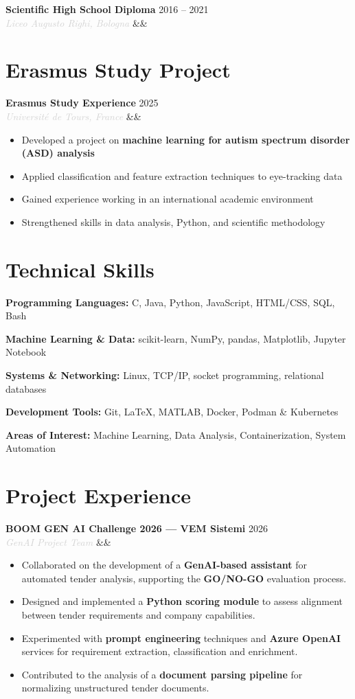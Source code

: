\documentclass[a4paper,10pt]{article}
\newcommand{\entry}[4]{%
  \noindent\textbf{#1} \hfill \textcolor{accent}{#2}\\
  \textit{\textcolor{lightgray}{#3}}%
  \ifx&#4&\else\\\vspace{0.2em}#4\fi
  \vspace{0.5em}
}
\newcommand{\entrylist}[5]{%
  \noindent\textbf{#1} \hfill \textcolor{accent}{#2}\\
  \textit{\textcolor{lightgray}{#3}}%
  \ifx&#4&\else\\\vspace{0.2em}#4\fi
  \vspace{0.3em}
  \begin{itemize}#5\end{itemize}
  \vspace{0.3em}
}
\newcommand{\skillgroup}[2]{%
  \noindent\textbf{#1:} #2\par\vspace{0.35em}
}
\begin{document}
\entry{Scientific High School Diploma}{2016 -- 2021}{Liceo Augusto Righi, Bologna}{}

\section{Erasmus Study Project}

\entrylist{Erasmus Study Experience}{2025}{Université de Tours, France}{}{
  \item Developed a project on \textbf{machine learning for autism spectrum disorder (ASD) analysis}
  \item Applied classification and feature extraction techniques to eye-tracking data
  \item Gained experience working in an international academic environment
  \item Strengthened skills in data analysis, Python, and scientific methodology
}

\section{Technical Skills}

\skillgroup{Programming Languages}{C, Java, Python, JavaScript, HTML/CSS, SQL, Bash}
\skillgroup{Machine Learning \& Data}{scikit-learn, NumPy, pandas, Matplotlib, Jupyter Notebook}
\skillgroup{Systems \& Networking}{Linux, TCP/IP, socket programming, relational databases}
\skillgroup{Development Tools}{Git, \LaTeX, MATLAB, Docker, Podman \& Kubernetes}
\skillgroup{Areas of Interest}{Machine Learning,
                               Data Analysis,
                               Containerization, System Automation}
\section{Project Experience}

\entrylist{BOOM GEN AI Challenge 2026 — VEM Sistemi}{2026}{GenAI Project Team}{}{
  \item Collaborated on the development of a \textbf{GenAI-based assistant} for automated tender analysis, supporting the \textbf{GO/NO-GO} evaluation process.
  \item Designed and implemented a \textbf{Python scoring module} to assess alignment between tender requirements and company capabilities.
  \item Experimented with \textbf{prompt engineering} techniques and \textbf{Azure OpenAI} services for requirement extraction, classification and enrichment.
  \item Contributed to the analysis of a \textbf{document parsing pipeline} for normalizing unstructured tender documents.
}
\end{document}
